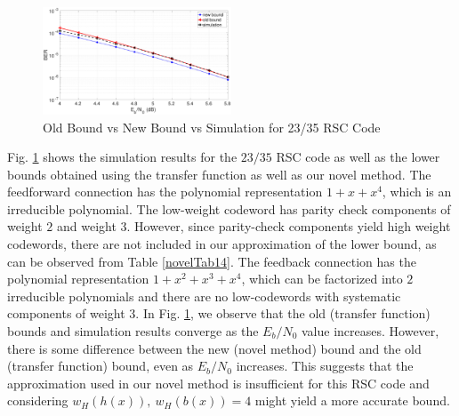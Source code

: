\begin{figure}[htbp]
\centering
		\includegraphics[width=0.5\textwidth]{./Images/RSC_23_35_lower_weights.eps}
		\caption{Old Bound vs New Bound vs Simulation for 23/35 RSC Code}
		\label{simFig3}
		\end{figure}
Fig. \ref{simFig3} shows the simulation results for the $23/35$ RSC code as well as the lower bounds obtained using the transfer function as well as our novel method. The feedforward connection has the polynomial representation $1+x+x^4$, which is an irreducible polynomial. The low-weight codeword has parity check components of weight $2$ and weight $3$. However, since parity-check components yield high weight codewords, there are not included in our approximation of the lower bound, as can be observed from Table \ref{novelTab14}. The feedback connection has the polynomial representation $1+x^2+x^3+x^4$, which can be factorized into $2$ irreducible polynomials and there are no low-codewords with systematic components of weight $3$. In Fig. \ref{simFig3}, we observe that the old (transfer function) bounds and simulation results converge as the $E_b/N_0$ value increases. However, there is some difference between the new (novel method) bound and the old (transfer function) bound, even as $E_b/N_0$ increases. This suggests that the approximation used in our novel method is insufficient for this RSC code and considering  $w_H(h(x)),~w_H(b(x))=4$ might yield a more accurate bound.


		
		


